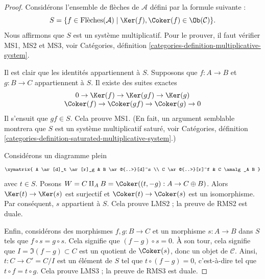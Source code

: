 \begin{proof}
Considérons l'ensemble de flèches de $\mathcal{A}$ défini par
la formule suivante :
$$
S = \{f \in \text{Flèches}(\mathcal{A}) \mid
\Ker(f), \Coker(f) \in \Ob(\mathcal{C}) \}.
$$
Nous affirmons que $S$ est un système multiplicatif. Pour le prouver, il faut
vérifier MS1, MS2 et MS3, voir
Catégories, définition \ref{categories-definition-multiplicative-system}.

\medskip\noindent
Il est clair que les identités appartiennent à $S$. Supposons que
$f : A \to B$ et $g : B \to C$ appartiennent à $S$.
Il existe des suites exactes
$$
\begin{matrix}
0 \to \Ker(f) \to \Ker(gf) \to \Ker(g) \\
\Coker(f) \to \Coker(gf) \to \Coker(g) \to 0
\end{matrix}
$$
Il s'ensuit que $gf \in S$. Cela prouve MS1. (En fait, un argument
semblable montrera que $S$ est un système multiplicatif saturé, voir
Catégories, définition
\ref{categories-definition-saturated-multiplicative-system}.)

\medskip\noindent
Considérons un diagramme plein
$$
\xymatrix{
A \ar[d]_t \ar[r]_g & B \ar@{..>}[d]^s \\
C \ar@{..>}[r]^f & C \amalg_A B
}
$$
avec $t \in S$. Posons
$W = C \amalg_A B =  \Coker((t, -g) : A \to C \oplus B)$.
Alors $\Ker(t) \to \Ker(s)$ est surjectif et
$\Coker(t) \to \Coker(s)$ est un isomorphisme. Par conséquent,
$s$ appartient à $S$. Cela prouve LMS2 ; la preuve de RMS2 est duale.

\medskip\noindent
Enfin, considérons des morphismes $f, g : B \to C$ et un morphisme $s : A \to B$
dans $S$ tels que $f \circ s = g \circ s$. Cela signifie que
$(f - g) \circ s = 0$. À son tour, cela signifie que
$I = \Im(f - g) \subset C$ est un quotient de $\Coker(s)$,
donc un objet de $\mathcal{C}$. Ainsi, $t : C \to C' = C/I$ est un
élément de $S$ tel que $t \circ (f - g) = 0$, c'est-à-dire tel que
$t \circ f = t \circ g$. Cela prouve LMS3 ; la preuve de
RMS3 est duale.


\end{proof}
